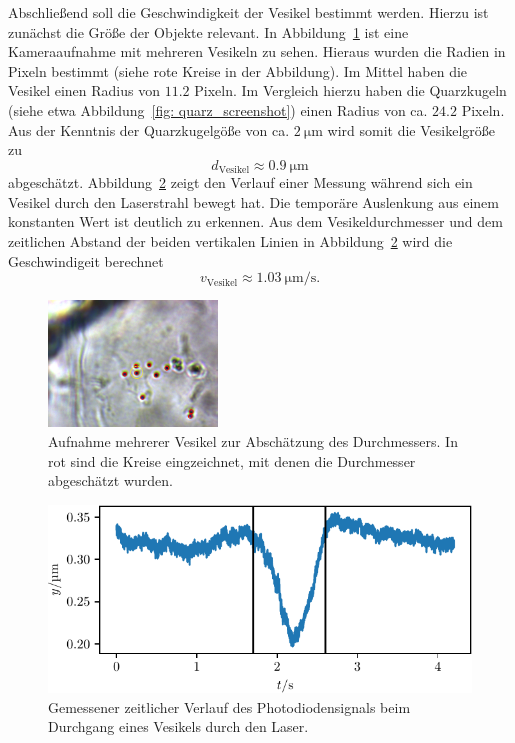 Abschließend soll die Geschwindigkeit der Vesikel bestimmt werden. Hierzu ist zunächst die Größe der Objekte relevant.
In Abbildung~\ref{fig: vesikel_size} ist eine Kameraaufnahme mit mehreren Vesikeln zu sehen. Hieraus wurden die Radien in Pixeln
bestimmt (siehe rote Kreise in der Abbildung). Im Mittel haben die Vesikel einen Radius von $\num{11.2}$ Pixeln. Im Vergleich hierzu haben die Quarzkugeln (siehe etwa
Abbildung~\ref{fig: quarz_screenshot}) einen Radius von ca. $\num{24.2}$ Pixeln.
Aus der Kenntnis der Quarzkugelgöße von ca. $\SI{2}{\micro\meter}$
wird somit die Vesikelgröße zu
\begin{equation}
d_{\text{Vesikel}} \approx \SI{0.9}{\micro\meter}
\end{equation}
abgeschätzt.
Abbildung~\ref{fig: velocity} zeigt den Verlauf einer Messung während sich ein Vesikel durch den Laserstrahl bewegt hat. Die temporäre
Auslenkung aus einem konstanten Wert ist deutlich zu erkennen. Aus dem Vesikeldurchmesser und dem zeitlichen Abstand der beiden vertikalen
Linien in Abbildung~\ref{fig: velocity} wird die Geschwindigeit berechnet
\begin{equation}
  v_{\text{Vesikel}} \approx \SI{1.03}{\micro\meter\per\second}.
\end{equation}
\begin{figure}
  \centering
  \includegraphics[width = 0.4\textwidth]{../analysis/data/iii_zwiebel/bilder/particle_size_(2)_circles.png}
  \caption{Aufnahme mehrerer Vesikel zur Abschätzung des Durchmessers. In rot sind die Kreise eingzeichnet, mit denen
  die Durchmesser abgeschätzt wurden. }
  \label{fig: vesikel_size}
\end{figure}
\begin{figure}
  \centering
  \includegraphics[scale = 1]{../analysis/data/iii_zwiebel/velocity/velocity.pdf}
  \caption{Gemessener zeitlicher Verlauf des Photodiodensignals beim Durchgang eines Vesikels durch den Laser.}
  \label{fig: velocity}
\end{figure}
